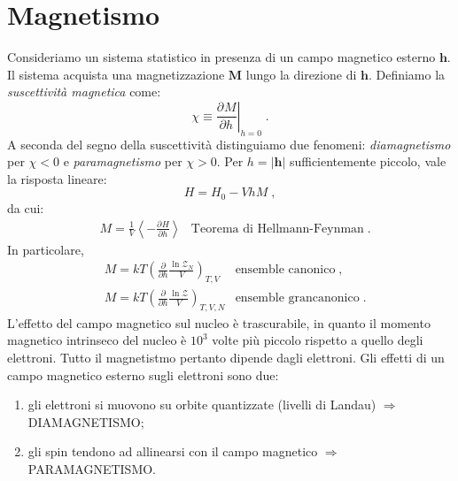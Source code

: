 \documentclass[10pt,a4paper]{report}
\theoremstyle{definition}
\newcommand{\pdev}[3][]{\frac{\partial^{#1} #2}{\partial #3^{#1}}}
\numberwithin{equation}{section}
\newcommand{\zpart}{\mathcal{Z}}
\begin{document}
\section{Magnetismo}
Consideriamo un sistema statistico in presenza di un campo magnetico esterno $\mathbf{h}$. Il sistema acquista una magnetizzazione $\mathbf{M}$ lungo la direzione di $\mathbf{h}$. Definiamo la \emph{suscettività magnetica} come:
\begin{equation}
\chi\equiv \left.\pdev{M}{h}\right|_{h=0}\;.
\end{equation}
A seconda del segno della suscettività distinguiamo due fenomeni: \emph{diamagnetismo} per $\chi<0$ e  \emph{paramagnetismo} per $\chi>0$. Per $h=|\mathbf{h}|$ sufficientemente piccolo, vale la risposta lineare:
\begin{equation}
H=H_0-VhM\;,
\end{equation}
da cui:
\begin{align}
&\boxed{M=\frac{1}{V}\left\langle -\pdev{H}{h}\right\rangle} &\mbox{Teorema di Hellmann-Feynman}\;.
\end{align}
In particolare,
\begin{align*}
& M=kT\left(\frac{\partial}{\partial h}\frac{\ln \zpart_N}{V}\right)_{T,V} & \mbox{ensemble canonico}\;, \\
& M=kT\left(\frac{\partial}{\partial h}\frac{\ln\zpart}{V}\right)_{T,V,N} & \mbox{ensemble grancanonico}\;.
\end{align*}
L'effetto del campo magnetico sul nucleo è trascurabile, in quanto il momento magnetico intrinseco del nucleo è $10^3$ volte più piccolo rispetto a quello degli elettroni. Tutto il magnetistmo pertanto dipende dagli elettroni. Gli effetti di un campo magnetico esterno sugli elettroni sono due:
\begin{enumerate}
\item gli elettroni si muovono su orbite quantizzate (livelli di Landau) $\Longrightarrow$ DIAMAGNETISMO;
\item gli spin tendono ad allinearsi con il campo magnetico $\Longrightarrow$ PARAMAGNETISMO.
\end{enumerate}
\end{document}
